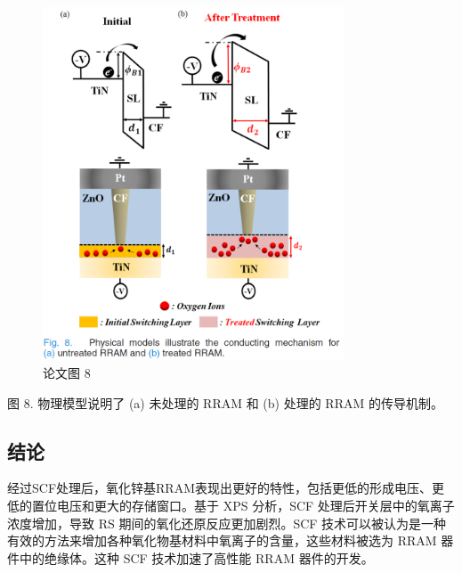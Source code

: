 \begin{figure}[htb]
\centering 
\includegraphics[width=0.80\textwidth]{img/c1m8.png} 
\caption{论文图 8}
\label{Test}
\end{figure}
图 8. 物理模型说明了 (a) 未处理的 RRAM 和 (b) 处理的 RRAM 的传导机制。




\subsection{结论}

经过SCF处理后，氧化锌基RRAM表现出更好的特性，包括更低的形成电压、更低的置位电压和更大的存储窗口。基于 XPS 分析，SCF 处理后开关层中的氧离子浓度增加，导致 RS 期间的氧化还原反应更加剧烈。SCF 技术可以被认为是一种有效的方法来增加各种氧化物基材料中氧离子的含量，这些材料被选为 RRAM 器件中的绝缘体。这种 SCF 技术加速了高性能 RRAM 器件的开发。


